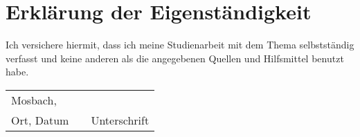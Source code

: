 \chapter*{Erklärung der Eigenständigkeit}

\begin{justify}
	\large Ich versichere hiermit, dass ich meine Studienarbeit mit dem Thema \kursiv{\title} selbstständig verfasst und keine anderen als die angegebenen Quellen und Hilfsmittel benutzt habe.
	
	\vspace{15pt}
	
	
	\vspace{25pt}
	
	\noindent 
	\begin{tabular}{lp{2em}l}
		
		Mosbach, \abgabe  && \hspace{6cm} \\\cline{1-1}\cline{3-3}
		
		Ort, Datum     && Unterschrift
		
	\end{tabular}
	
\end{justify}